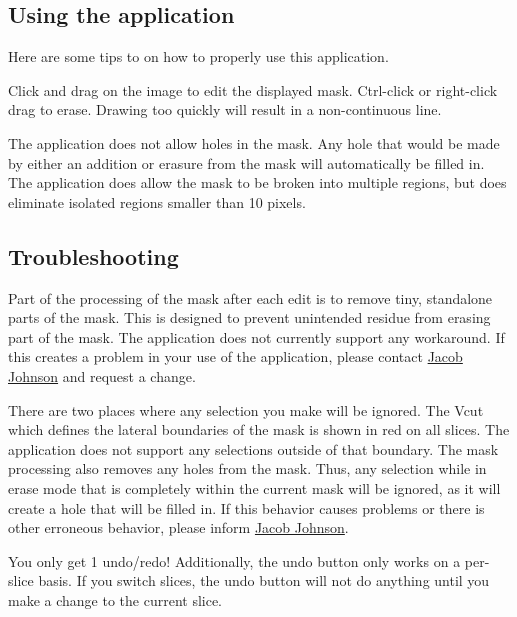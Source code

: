 \documentclass[twoside,a4paper]{refart}
\begin{document}

\subsection{Using the application}
Here are some tips to on how to properly use this application.


Click and drag on the image to edit the displayed mask. Ctrl-click or right-click drag to erase. Drawing too quickly will result in a non-continuous line.

The application does not allow holes in the mask. Any hole that would be made by either an addition or erasure from the mask will automatically be filled in. The application does allow the mask to be broken into multiple regions, but does eliminate isolated regions smaller than 10 pixels.



\subsection{Troubleshooting}

Part of the processing of the mask after each edit is to remove tiny, standalone parts of the mask. This is designed to prevent unintended residue from erasing part of the mask. The application does not currently support any workaround. If this creates a problem in your use of the application, please contact \href{mailto:jmjohnson33@wisc.edu}{Jacob Johnson} and request a change.

There are two places where any selection you make will be ignored. The Vcut which defines the lateral boundaries of the mask is shown in red on all slices. The application does not support any selections outside of that boundary.
The mask processing also removes any holes from the mask. Thus, any selection while in erase mode that is completely within the current mask will be ignored, as it will create a hole that will be filled in.
If this behavior causes problems or there is other erroneous behavior, please inform \href{mailto:jmjohnson33@wisc.edu}{Jacob Johnson}.

You only get 1 undo/redo! Additionally, the undo button only works on a per-slice basis. If you switch slices, the undo button will not do anything until you make a change to the current slice.








\printindex
\end{document}
